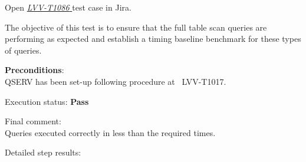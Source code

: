 \documentclass[DM,STR,toc]{lsstdoc}
\begin{document}
Open  \href{https://jira.lsstcorp.org/secure/Tests.jspa#/testCase/LVV-T1086}{\textit{ LVV-T1086 } }
test case in Jira.

    The objective of this test is to ensure that the full table scan queries
are performing as expected and establish a timing baseline benchmark for
these types of queries.


    \textbf{ Preconditions}:\\
    QSERV has been set-up following procedure at ~LVV-T1017.


    Execution status: {\bf Pass }

    Final comment:\\Queries executed correctly in less than the required times.



    Detailed step results:
\end{document}
